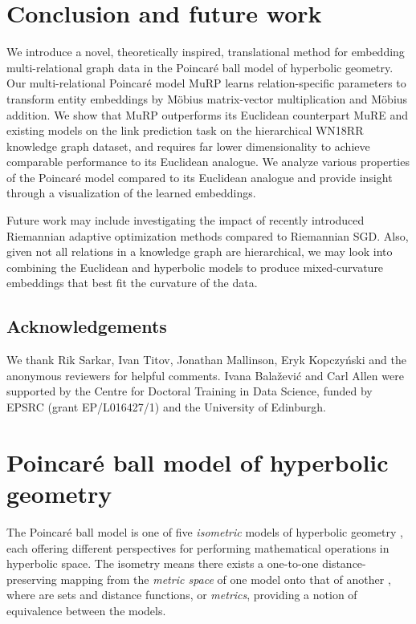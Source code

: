 \documentclass{article}
\begin{document}
\vspace{-0.1cm}
\section{Conclusion and future work}
\vspace{-0.1cm}
We introduce a novel, theoretically inspired, translational method for embedding multi-relational graph data in the Poincar{\'e} ball model of hyperbolic geometry. Our multi-relational Poincar{\'e} model MuRP learns relation-specific parameters to transform entity embeddings by Möbius matrix-vector multiplication and Möbius addition. We show that MuRP outperforms its Euclidean counterpart MuRE and existing models on the link prediction task on the hierarchical WN18RR knowledge graph dataset, and requires far lower dimensionality to achieve comparable performance to its Euclidean analogue. We analyze various properties of the Poincar{\'e} model compared to its Euclidean analogue and provide insight through a visualization of the learned embeddings. 

Future work may include investigating the impact of recently introduced Riemannian adaptive optimization methods compared to Riemannian SGD. Also, given not all relations in a knowledge graph are hierarchical, we may look into combining the Euclidean and hyperbolic models to produce mixed-curvature embeddings that best fit the curvature of the data.

\subsection*{Acknowledgements}
We thank Rik Sarkar, Ivan Titov, Jonathan Mallinson, Eryk Kopczyński and the anonymous reviewers for helpful comments. Ivana Bala\v{z}evi\'c and Carl Allen were supported by the Centre for Doctoral Training in Data Science, funded by EPSRC (grant EP/L016427/1) and the University of Edinburgh.




\clearpage
\appendix

\section{Poincar{\'e} ball model of hyperbolic geometry}\label{sec:apphyperbolic}
The Poincar{\'e} ball model is one of five \textit{isometric} models of hyperbolic geometry \citep{cannon1997hyperbolic}, each offering different perspectives for performing mathematical operations in hyperbolic space. The isometry means there exists a one-to-one distance-preserving mapping from the \textit{metric space} of one model  onto that of another , where  are sets and  distance functions, or \textit{metrics}, providing a notion of equivalence between the models.
\end{document}
